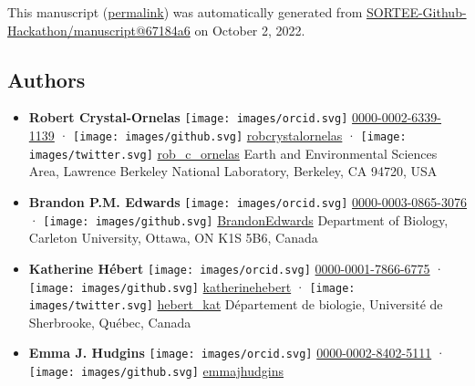 This manuscript
(\href{https://SORTEE-Github-Hackathon.github.io/manuscript/v/67184a6d4709f90ee2da7a7f13a18ae8b930330f/}{permalink})
was automatically generated
from \href{https://github.com/SORTEE-Github-Hackathon/manuscript/tree/67184a6d4709f90ee2da7a7f13a18ae8b930330f}{SORTEE-Github-Hackathon/manuscript@67184a6}
on October 2, 2022.

\hypertarget{authors}{%
\subsection{Authors}\label{authors}}

\begin{itemize}
\item
  \textbf{Robert Crystal-Ornelas}
  \texttt{[image: images/orcid.svg]}
  \href{https://orcid.org/0000-0002-6339-1139}{0000-0002-6339-1139}
  · \texttt{[image: images/github.svg]}
  \href{https://github.com/robcrystalornelas}{robcrystalornelas}
  · \texttt{[image: images/twitter.svg]}
  \href{https://twitter.com/rob_c_ornelas}{rob\_c\_ornelas}
  Earth and Environmental Sciences Area, Lawrence Berkeley National Laboratory, Berkeley, CA 94720, USA
\item
  \textbf{Brandon P.M. Edwards}
  \texttt{[image: images/orcid.svg]}
  \href{https://orcid.org/0000-0003-0865-3076}{0000-0003-0865-3076}
  · \texttt{[image: images/github.svg]}
  \href{https://github.com/BrandonEdwards}{BrandonEdwards}
  Department of Biology, Carleton University, Ottawa, ON K1S 5B6, Canada
\item
  \textbf{Katherine Hébert}
  \texttt{[image: images/orcid.svg]}
  \href{https://orcid.org/0000-0001-7866-6775}{0000-0001-7866-6775}
  · \texttt{[image: images/github.svg]}
  \href{https://github.com/katherinehebert}{katherinehebert}
  · \texttt{[image: images/twitter.svg]}
  \href{https://twitter.com/hebert_kat}{hebert\_kat}
  Département de biologie, Université de Sherbrooke, Québec, Canada
\item
  \textbf{Emma J. Hudgins}
  \texttt{[image: images/orcid.svg]}
  \href{https://orcid.org/0000-0002-8402-5111}{0000-0002-8402-5111}
  · \texttt{[image: images/github.svg]}
  \href{https://github.com/emmajhudgins}{emmajhudgins}

\end{itemize}
